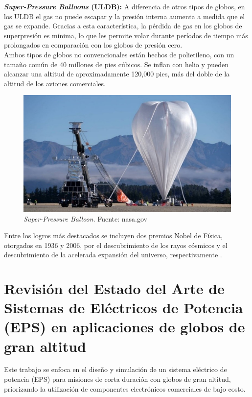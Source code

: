 \textbf{\emph{Super-Pressure Balloons} (ULDB):} A diferencia de otros tipos de globos, en los ULDB el gas no puede escapar y la presión interna aumenta a medida que el gas se expande. Gracias a esta característica, la pérdida de gas en los globos de superpresión es mínima, lo que les permite volar durante períodos de tiempo más prolongados en comparación con los globos de presión cero.\\
Ambos tipos de globos no convencionales están hechos de polietileno, con un tamaño común de 40 millones de pies cúbicos. Se inflan con helio y pueden alcanzar una altitud de aproximadamente 120,000 pies, más del doble de la altitud de los aviones comerciales.


\begin{figure}[h!]
\centering
\includegraphics[width=.8\textwidth]{Pictures/SuperP.jpg}
\caption{\emph{Super-Pressure Balloon}. Fuente: nasa.gov }\label{fig:SuperP}
\end{figure}

\newpage

Entre los logros más destacados se incluyen dos premios Nobel de Física, otorgados en 1936 y 2006, por el descubrimiento de los rayos cósmicos y el descubrimiento de la acelerada expansión del universo, respectivamente \cite{Nobel}.

\newpage


\section{Revisión del Estado del Arte de Sistemas de Eléctricos de Potencia (EPS) en aplicaciones de globos de gran altitud}

\vspace{0.5 cm}

Este trabajo se enfoca en el diseño y simulación de un sistema eléctrico de potencia (EPS) para misiones de corta duración con globos de gran altitud, priorizando la utilización de componentes electrónicos comerciales de bajo costo.

